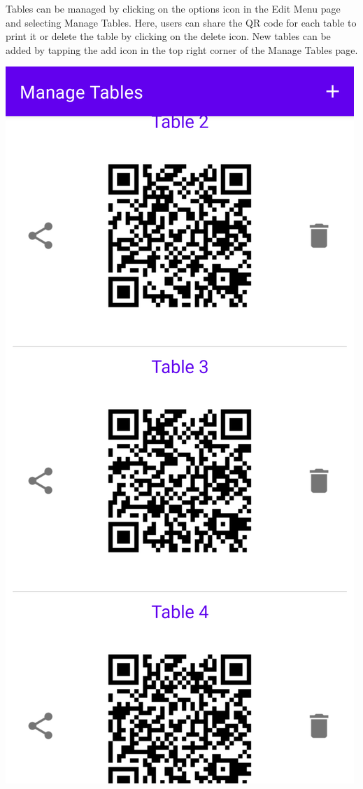 \documentclass{article}
\begin{document}
\newpage
Tables can be managed by clicking on the options icon in the Edit Menu page and selecting Manage Tables. Here, users can share the QR code for each table to print it or delete the table by clicking on the delete icon. New tables can be added by tapping the add icon in the top right corner of the Manage Tables page. \begin{center}
\includegraphics[scale=0.15]{manage-tables}

\end{center}
\end{document}
